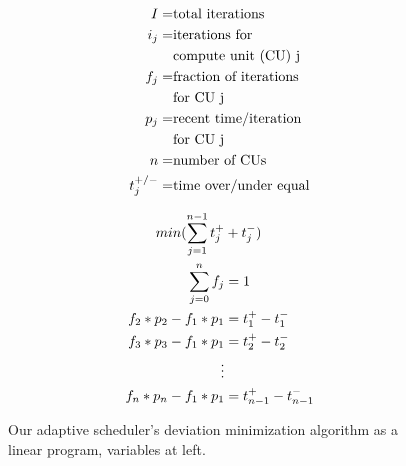 \begin{figure}[t]
  \footnotesize
  \begin{minipage}[b]{1\columnwidth}
    \begin{minipage}[c]{.41\columnwidth}
      \begin{align}
        I     =& \textrm{total iterations}\notag\\
        i_j   =& \textrm{iterations for}\notag\\
               & \textrm{compute unit~(CU) j}\notag\\
        f_j   =& \textrm{fraction of iterations}\notag\\
               & \textrm{for CU j}\notag\\
        p_j   =& \textrm{recent time/iteration}\notag\\
               & \textrm{for CU j}\notag\\
        n     =& \textrm{number of CUs}\notag\\
        t_j^{+/-} =& \textrm{time over/under equal\notag}
      \end{align}
    \end{minipage}
    \begin{minipage}[c]{.56\columnwidth}
      \begin{align}
        \label{eqn:o2} min(\sum\limits_{j=1}^{n-1} t_j^+ &+ t_j^-)\\
        \label{eqn:lps2}\sum\limits_{j=0}^n f_j &= 1\\
        f_2 * p_2 - f_1 * p_1 &= t_1^+ - t_1^-\\
        f_3 * p_3 - f_1 * p_1 &= t_2^+ - t_2^-\\
        \vdots\notag\\
        \label{eqn:lpe2}f_n * p_n - f_1 *  p_1 &= t_{n-1}^+ - t_{n-1}^-
      \end{align}
    \end{minipage}
  \end{minipage}
  \normalsize
  \caption{Our adaptive scheduler's deviation minimization algorithm as a
    linear program, variables at left.\label{fig:lp_stuff}}
\end{figure}

